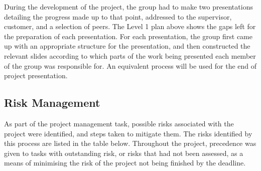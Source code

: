 During the development of the project, the group had to make two presentations
detailing the progress made up to that point, addressed to the supervisor,
customer, and a selection of peers. The Level 1 plan above shows the gaps left
for the preparation of each presentation. For each presentation, the group first
came up with an appropriate structure for the presentation, and then constructed
the relevant slides according to which parts of the work being presented each
member of the group was responsible for. An equivalent process will be used for
the end of project presentation.


\subsection{Risk Management}

As part of the project management task, possible risks associated with the
project were identified, and steps taken to mitigate them. The risks identified
by this process are listed in the table below. Throughout  the
project, precedence was given to tasks with outstanding risk, or risks that had
not been assessed, as a means of minimising the risk of the project not being
finished by the deadline.

